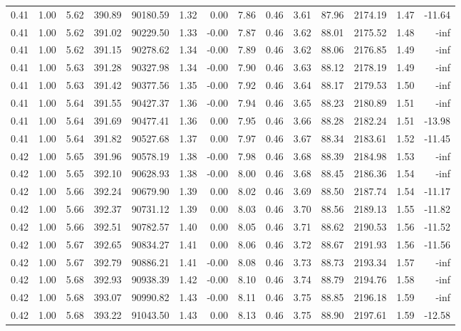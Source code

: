 \begin{table}[!ht]
\begin{tabular}{rrrrrrrrrrrrrr}
0.41 & 1.00 & 5.62 & 390.89 & 90180.59 & 1.32 & 0.00 & 7.86 & 0.46 & 3.61 & 87.96 & 2174.19 & 1.47 & -11.64 \\
0.41 & 1.00 & 5.62 & 391.02 & 90229.50 & 1.33 & -0.00 & 7.87 & 0.46 & 3.62 & 88.01 & 2175.52 & 1.48 & -inf \\
0.41 & 1.00 & 5.62 & 391.15 & 90278.62 & 1.34 & -0.00 & 7.89 & 0.46 & 3.62 & 88.06 & 2176.85 & 1.49 & -inf \\
0.41 & 1.00 & 5.63 & 391.28 & 90327.98 & 1.34 & -0.00 & 7.90 & 0.46 & 3.63 & 88.12 & 2178.19 & 1.49 & -inf \\
0.41 & 1.00 & 5.63 & 391.42 & 90377.56 & 1.35 & -0.00 & 7.92 & 0.46 & 3.64 & 88.17 & 2179.53 & 1.50 & -inf \\
0.41 & 1.00 & 5.64 & 391.55 & 90427.37 & 1.36 & -0.00 & 7.94 & 0.46 & 3.65 & 88.23 & 2180.89 & 1.51 & -inf \\
0.41 & 1.00 & 5.64 & 391.69 & 90477.41 & 1.36 & 0.00 & 7.95 & 0.46 & 3.66 & 88.28 & 2182.24 & 1.51 & -13.98 \\
0.41 & 1.00 & 5.64 & 391.82 & 90527.68 & 1.37 & 0.00 & 7.97 & 0.46 & 3.67 & 88.34 & 2183.61 & 1.52 & -11.45 \\
0.42 & 1.00 & 5.65 & 391.96 & 90578.19 & 1.38 & -0.00 & 7.98 & 0.46 & 3.68 & 88.39 & 2184.98 & 1.53 & -inf \\
0.42 & 1.00 & 5.65 & 392.10 & 90628.93 & 1.38 & -0.00 & 8.00 & 0.46 & 3.68 & 88.45 & 2186.36 & 1.54 & -inf \\
0.42 & 1.00 & 5.66 & 392.24 & 90679.90 & 1.39 & 0.00 & 8.02 & 0.46 & 3.69 & 88.50 & 2187.74 & 1.54 & -11.17 \\
0.42 & 1.00 & 5.66 & 392.37 & 90731.12 & 1.39 & 0.00 & 8.03 & 0.46 & 3.70 & 88.56 & 2189.13 & 1.55 & -11.82 \\
0.42 & 1.00 & 5.66 & 392.51 & 90782.57 & 1.40 & 0.00 & 8.05 & 0.46 & 3.71 & 88.62 & 2190.53 & 1.56 & -11.52 \\
0.42 & 1.00 & 5.67 & 392.65 & 90834.27 & 1.41 & 0.00 & 8.06 & 0.46 & 3.72 & 88.67 & 2191.93 & 1.56 & -11.56 \\
0.42 & 1.00 & 5.67 & 392.79 & 90886.21 & 1.41 & -0.00 & 8.08 & 0.46 & 3.73 & 88.73 & 2193.34 & 1.57 & -inf \\
0.42 & 1.00 & 5.68 & 392.93 & 90938.39 & 1.42 & -0.00 & 8.10 & 0.46 & 3.74 & 88.79 & 2194.76 & 1.58 & -inf \\
0.42 & 1.00 & 5.68 & 393.07 & 90990.82 & 1.43 & -0.00 & 8.11 & 0.46 & 3.75 & 88.85 & 2196.18 & 1.59 & -inf \\
0.42 & 1.00 & 5.68 & 393.22 & 91043.50 & 1.43 & 0.00 & 8.13 & 0.46 & 3.75 & 88.90 & 2197.61 & 1.59 & -12.58 \\

\end{tabular}
\end{table}
